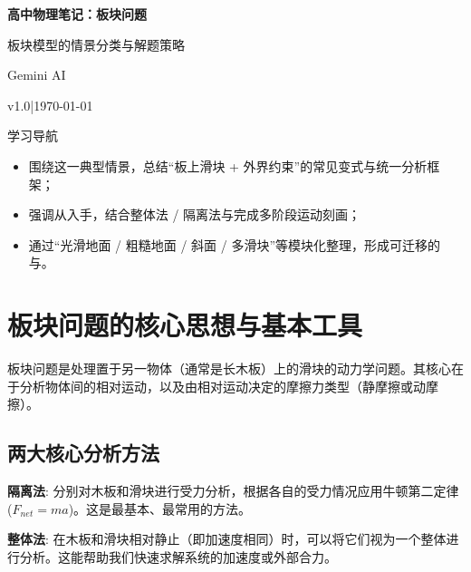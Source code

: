 \documentclass[a4paper,11pt]{ctexart}
\renewcommand{\notetitle}{高中物理笔记：板块问题}
\renewcommand{\noteauthor}{Gemini AI}
\renewcommand{\notedate}{\today}
\renewcommand{\notesubtitle}{板块模型的情景分类与解题策略}
\renewcommand{\noteversion}{v1.0}
\begin{document}
\thispagestyle{empty}
\setcounter{page}{1}

\noindent
\begin{minipage}[t][0.7\textheight][c]{\textwidth}
  \raggedleft
  \vspace*{\fill}
  {\sffamily\bfseries\Huge\color{accent}\notetitle\par}
  \vspace{0.6em}
  {\Large\color{inkgray}\notesubtitle\par}
  \vspace{0.5em}
  {\large\color{inkgray}\noteauthor\par}
  \vspace{0.4em}
  {\normalsize\color{inkgray}\noteversion\quad|\quad\notedate\par}
  \vspace*{\fill}
\end{minipage}

\begin{center}
\begin{minipage}{0.84\textwidth}
  \textcolor{inkgray}{\sffamily\small 学习导航}\\
  \begin{itemize}
    \item 围绕这一典型情景，总结“板上滑块 + 外界约束”的常见变式与统一分析框架；
    \item 强调从入手，结合整体法 / 隔离法与完成多阶段运动刻画；
    \item 通过“光滑地面 / 粗糙地面 / 斜面 / 多滑块”等模块化整理，形成可迁移的与。
  \end{itemize}
\end{minipage}
\end{center}
\vspace{1em}

\clearpage
\thispagestyle{plain}

\tableofcontents
\newpage

\section{板块问题的核心思想与基本工具}

板块问题是处理置于另一物体（通常是长木板）上的滑块的动力学问题。其核心在于分析物体间的相对运动，以及由相对运动决定的摩擦力类型（静摩擦或动摩擦）。

\subsection{两大核心分析方法}
\begin{focuspoints}
    \item \textbf{隔离法}: 分别对木板和滑块进行受力分析，根据各自的受力情况应用牛顿第二定律 ($F_{net} = ma$)。这是最基本、最常用的方法。
    \item \textbf{整体法}: 在木板和滑块相对静止（即加速度相同）时，可以将它们视为一个整体进行分析。这能帮助我们快速求解系统的加速度或外部合力。
\end{focuspoints}
\end{document}
